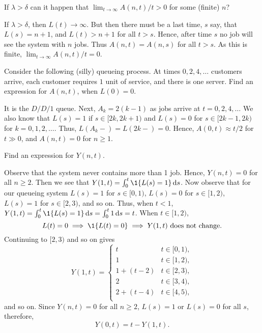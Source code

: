 \begin{exercise} \label{ex:38}
If $\lambda>\delta$ can it happen that $ \lim_{t\to\infty} A(n,t)/t > 0$ for some (finite) $n$?
\begin{solution}
 If $\lambda > \delta$, then $L(t)\to\infty$.
 But then there must be a last time, $s$ say, that $L(s) = n+1$, and $L(t) > n+1$ for all $t>s$.
 Hence, after time $s$ no job will see the system with $n$ jobs.
 Thus $A(n,t) = A(n,s)$ for all $t>s$.
As this is  finite, $\lim_{t\to\infty}A(n,t)/t=0$.
\end{solution}
\end{exercise}

 \begin{exercise} \label{ex:111}
Consider the following (silly) queueing process.
 At times $0, 2,4, \ldots$ customers arrive, each customer requires $1$ unit of service, and there is one server.
 Find an expression for $A(n,t)$, when $L(0)=0$.
\begin{solution}
 It is the $D/D/1$ queue. Next, $A_{k} = 2(k-1)$ as jobs arrive at $t=0, 2, 4, \ldots$
 We also know that $L(s)=1$ if $s\in [2k, 2k+1)$ and $L(s)=0$ for $s\in[2k-1, 2k)$ for $k=0, 1, 2, \ldots$.
 Thus, $L(A_k-) = L(2k-)=0$.
 Hence, $A(0,t) \approx t/2$ for $t\gg 0$, and $A(n,t)=0$ for $n\geq 1$.
\end{solution}
\end{exercise}


\begin{exercise} \label{ex:112}
 Find
 an expression for $Y(n,t)$.
\begin{solution}
Observe that the system never contains
 more than 1 job. Hence, $Y(n,t)=0$ for all $n\geq 2$. Then we see that
 $Y(1,t) = \int_0^t \1{\L(s) = 1}\d s$. Now observe that for our
 queueing system $L(s)=1$ for $s\in[0,1)$, $L(s)=0$ for
 $s\in[1,2)$, $L(s)=1$ for $s\in[2,3)$, and so on. Thus, when
 $t<1$, $Y(1,t)=\int_0^t \1{\L(s)=1} \d s = \int_0^t 1\d s = t$.
 When $t\in[1,2)$,
 \begin{equation*}
 L(t)=0 \implies \1{\L(t)=0} \implies Y(1,t) \text{ does not change}.
 \end{equation*}
Continuing to $[2,3)$ and so on gives
 \begin{equation*}
 Y(1,t) =
 \begin{cases}
 t & t\in[0,1), \\
 1 & t\in[1,2), \\
 1+(t-2) & t\in[2,3), \\
 2 & t\in[3,4), \\
 2+(t-4) & t\in[4,5), \\
 \end{cases}
 \end{equation*}
 and so on. Since $Y(n,t)=0$ for all $n\geq 2$, $L(s) = 1$ or
 $L(s)=0$ for all $s$, therefore,
 \begin{equation*}
 Y(0,t) = t-Y(1,t).
 \end{equation*}
\end{solution}
\end{exercise}

